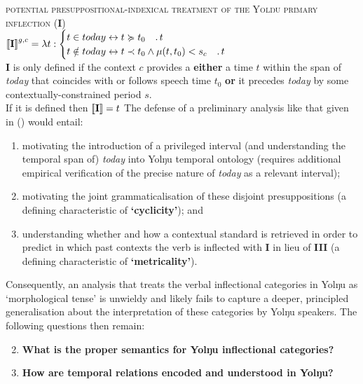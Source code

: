 \documentclass[12pt]{article}
\newcommand{\denote}[1]{\mbox{$[\![\mbox{#1}]\!]$}}
\begin{document}
\pex\textsc{potential presuppositional-indexical treatment of the Yolŋu primary inflection (\textbf{I})}\\
 $\denote{\textbf{I}}^{g,c}=\lambda t:\begin{cases}t\in today\leftrightarrow t\succcurlyeq t_0\quad.\,t\\
t\notin today \leftrightarrow t\prec t_0\wedge\mu(t,t_0)<s_c\quad.\,t
\end{cases}$\\
\textbf{I} is only defined if the context $c$ provides a \textbf{either} a time $t$ within the span of \textit{today} that coincides with or follows speech time $t_0$ \textbf{or} it precedes \textit{today} by some contextually-constrained period $s$.\\
If it is defined then $\denote{\textbf{I}}=t$
\xe
The defense of a preliminary analysis like that given in (\lastx) would entail:
\begin{enumerate}[label=\alph*.]
	\item motivating the introduction of a privileged interval (and understanding the temporal span of) \textit{today} into Yolŋu temporal ontology (requires additional empirical verification of the precise nature of \textit{today} as a relevant interval);
	\item motivating the joint grammaticalisation of these disjoint presuppositions (a defining characteristic of \textbf{`cyclicity'}); and
	\item understanding whether and how a contextual standard is retrieved in order to predict in which past contexts the verb is inflected with \textbf{I} in lieu of \textbf{III} (a defining characteristic of \textbf{`metricality'}).
	
\end{enumerate}

Consequently, an analysis that treats the verbal inflectional categories in Yolŋu as `morphological tense' is unwieldy and likely fails to capture a deeper, principled generalisation about the interpretation of these categories by Yolŋu speakers. The following questions then remain:
\begin{framed}
	\begin{enumerate}[label=\textbf{(\roman*)}]\setcounter{enumi}{1}
	\item \textbf{What is the proper semantics for Yolŋu inflectional categories?}
	\item \textbf{How are temporal relations encoded and understood in Yolŋu?}
\end{enumerate}\end{framed}
\end{document}
